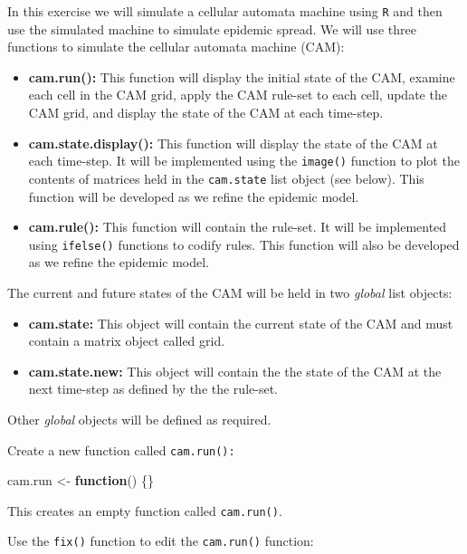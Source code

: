 \documentclass[12pt,a4paper]{book}
\newenvironment{Shaded}{\begin{snugshade}}{\end{snugshade}}
\newcommand{\StringTok}[1]{\textcolor[rgb]{0.31,0.60,0.02}{#1}}
\newcommand{\ControlFlowTok}[1]{\textcolor[rgb]{0.13,0.29,0.53}{\textbf{#1}}}
\newcommand{\NormalTok}[1]{#1}
\theoremstyle{definition}
\theoremstyle{definition}
\theoremstyle{definition}
\theoremstyle{remark}
\begin{document}
In this exercise we will simulate a cellular automata machine using
\texttt{R} and then use the simulated machine to simulate epidemic
spread. We will use three functions to simulate the cellular automata
machine (CAM):

\begin{itemize}
\item
  \textbf{cam.run():} This function will display the initial state of
  the CAM, examine each cell in the CAM grid, apply the CAM rule-set to
  each cell, update the CAM grid, and display the state of the CAM at
  each time-step.
\item
  \textbf{cam.state.display():} This function will display the state of
  the CAM at each time-step. It will be implemented using the
  \texttt{image()} function to plot the contents of matrices held in the
  \texttt{cam.state} list object (see below). This function will be
  developed as we refine the epidemic model.
\item
  \textbf{cam.rule():} This function will contain the rule-set. It will
  be implemented using \texttt{ifelse()} functions to codify rules. This
  function will also be developed as we refine the epidemic model.
\end{itemize}

The current and future states of the CAM will be held in two
\emph{global} list objects:

\begin{itemize}
\item
  \textbf{cam.state:} This object will contain the current state of the
  CAM and must contain a matrix object called grid.
\item
  \textbf{cam.state.new:} This object will contain the the state of the
  CAM at the next time-step as defined by the the rule-set.
\end{itemize}

Other \emph{global} objects will be defined as required.

Create a new function called \texttt{cam.run():}

\begin{Shaded}
\begin{Highlighting}[]
\NormalTok{cam.run <-}\StringTok{ }\ControlFlowTok{function}\NormalTok{() \{\}}
\end{Highlighting}
\end{Shaded}

This creates an empty function called \texttt{cam.run()}.

Use the \texttt{fix()} function to edit the \texttt{cam.run()} function:
\end{document}
